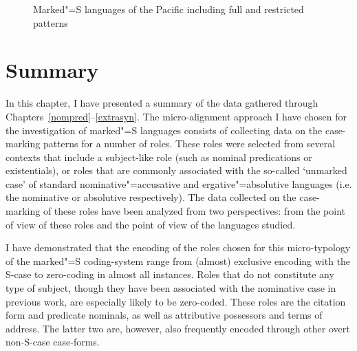 \begin{figure}[h,t,b] \centering {}\caption{Marked"=S languages of the Pacific including full and restricted patterns}\label{MapPacAll}
\end{figure}


\section{Summary}\label{sumtyp}

In this chapter, I have presented a summary of the data gathered through Chapters~\ref{nompred}--\ref{extrasyn}. 
The micro-alignment approach I have chosen for the investigation of marked"=S languages consists of collecting data on the case-marking patterns for a number of roles. 
These roles were selected from several contexts that include a subject-like role (such as nominal predications or existentials), or roles that are commonly associated with the so-called `unmarked case' of standard nominative"=accusative and ergative"=absolutive languages (i.e. the nominative or absolutive respectively).
The data collected on the case-marking of these roles have been analyzed from two perspectives: from the point of view of these roles and the point of view of the languages studied.

I have demonstrated that the encoding of the roles chosen for this micro-ty\-po\-lo\-gy of the marked"=S coding-system range from (almost) exclusive encoding with the S-case to zero-coding in almost all instances. 
Roles that do not constitute any type of subject, though they have been associated with the nominative case in previous work, are especially likely to be zero-coded. 
These roles are the citation form and predicate nominals, as well as attributive possessors and terms of address. 
The latter two are, however, also frequently encoded through other overt non-S-case case-forms.

